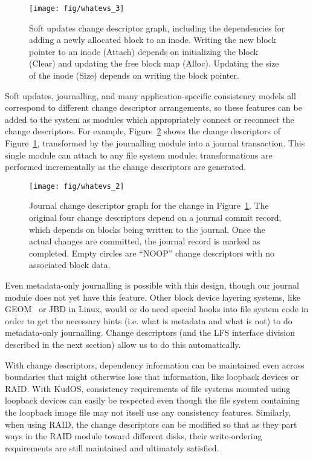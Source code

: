 \begin{figure}[b]
  \centering
  \texttt{[image: fig/whatevs\_3]}%
  \caption{\label{fig:softupdates} Soft updates change descriptor graph,
  including the dependencies for adding a newly allocated block to an
  inode. Writing the new block pointer to an inode (Attach) depends on
  initializing the block (Clear) and updating the free block map (Alloc).
  Updating the size of the inode (Size) depends on writing the block
  pointer.}
\end{figure}

Soft updates, journalling, and many application-specific consistency models all
correspond to different change descriptor arrangements, so these features can be
added to the system as modules which appropriately connect or reconnect the
change descriptors. For example, Figure~\ref{fig:journal} shows the change
descriptors of Figure~\ref{fig:softupdates}, transformed by the journalling
module into a journal transaction. This single module can attach to any
file system module; transformations
are performed incrementally as the change descriptors are generated.

\begin{figure}
  \centering
  \texttt{[image: fig/whatevs\_2]}%
  \caption{\label{fig:journal} Journal change descriptor graph for the
  change in Figure~\ref{fig:softupdates}.  The original four change
  descriptors depend on a journal commit record, which depends on blocks
  being written to the journal.  Once the actual changes are committed, the
  journal record is marked as completed.  Empty circles are ``NOOP'' change
  descriptors with no associated block data.  }
\end{figure}

Even metadata-only journalling is possible with this design, though our journal
module does not yet have this feature. Other block device layering systems, like
GEOM~\cite{geom} or JBD in Linux, would or do need special hooks into file system
code in order to get the necessary hints (i.e. what is metadata and what is not)
to do metadata-only journalling. Change descriptors (and the LFS interface
division described in the next section) allow us to do this automatically.

With change descriptors,
dependency information can be maintained even across boundaries that might
otherwise lose that information, like loopback devices or RAID. With KudOS,
consistency requirements of file systems mounted using loopback devices can
easily be respected even though the file system containing the loopback image
file may not itself use any consistency features. Similarly, when using RAID,
the change descriptors can be modified so that as they part ways in the RAID
module toward different disks, their write-ordering requirements are still
maintained and ultimately satisfied.

